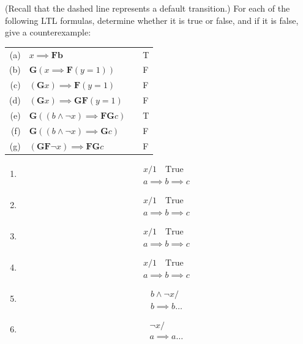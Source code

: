 \documentclass[12pt]{article}
\begin{document}
\begin{qsolve}
	(Recall that the dashed line represents a default transition.) For each of the following LTL formulas, determine whether it is true or false, and if it is false, give a counterexample:
	
	
	
	\begin{tabular}{rlcl}
		(a) & \(x \implies \mathbf{Fb}\) & & T \\
		(b) & \(\mathbf{G}(x \implies \mathbf{F}(y = 1))\) & & F \\
		(c) & \((\mathbf{G}x) \implies \mathbf{F}(y = 1)\) & & F \\
		(d) & \((\mathbf{G}x) \implies \mathbf{GF}(y = 1)\) & & F \\
		(e) & \(\mathbf{G}((b \land \neg x) \implies \mathbf{FG}c)\) & & T \\
		(f) & \(\mathbf{G}((b \land \neg x) \implies \mathbf{G}c)\) & & F \\
		(g) & \((\mathbf{GF}\neg x) \implies \mathbf{FG}c\) & & F \\
	\end{tabular}
	
	\vspace{1cm}
	
	\begin{enumerate}[label=(\alph*)]
		\item 
		\[
		\begin{array}{c}
			x / 1 \quad \text{True} \\
			a \implies b \implies c
		\end{array}
		\]
		\item 
		\[
		\begin{array}{c}
			x / 1 \quad \text{True} \\
			a \implies b \implies c
		\end{array}
		\]
		\item 
		\[
		\begin{array}{c}
			x / 1 \quad \text{True} \\
			a \implies b \implies c
		\end{array}
		\]
		\item 
		\[
		\begin{array}{c}
			x / 1 \quad \text{True} \\
			a \implies b \implies c
		\end{array}
		\]
		\item 
		\[
		\begin{array}{c}
			b \land \neg x / \\
			b \implies b \ldots
		\end{array}
		\]
		\item 
		\[
		\begin{array}{c}
			\neg x / \\
			a \implies a \ldots
		\end{array}
		\]
	\end{enumerate}
\end{qsolve}
\end{document}
